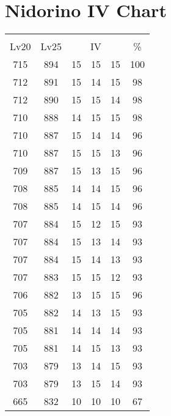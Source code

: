 \documentclass{article}%
\begin{document}
%
\normalsize%
\section{Nidorino IV Chart}%
\label{sec:Nidorino IV Chart}%
\renewcommand{\arraystretch}{1.5}%
\begin{tabular}{|c|c|c|c|c|c|}%
\hline%
\multicolumn{6}{|c|}{\textcolor{white}{ 
\linebreak{Nidorino}
}%
\cellcolor{black}}\\%
\multicolumn{1}{|c}{Lv20}&\multicolumn{1}{c|}{Lv25}&\multicolumn{3}{c|}{IV}&\multicolumn{1}{|c|}{\%}\\%
\hline%
\rowcolor{color100}%
715&894&15&15&15&100\\%
\hline%
\rowcolor{color98}%
712&891&15&14&15&98\\%
\hline%
\rowcolor{color98}%
712&890&15&15&14&98\\%
\hline%
\rowcolor{color98}%
710&888&14&15&15&98\\%
\hline%
\rowcolor{color96}%
710&887&15&14&14&96\\%
\hline%
\rowcolor{color96}%
710&887&15&15&13&96\\%
\hline%
\rowcolor{color96}%
709&887&15&13&15&96\\%
\hline%
\rowcolor{color96}%
708&885&14&14&15&96\\%
\hline%
\rowcolor{color96}%
708&885&14&15&14&96\\%
\hline%
\rowcolor{color93}%
707&884&15&12&15&93\\%
\hline%
\rowcolor{color93}%
707&884&15&13&14&93\\%
\hline%
\rowcolor{color93}%
707&884&15&14&13&93\\%
\hline%
\rowcolor{color93}%
707&883&15&15&12&93\\%
\hline%
\rowcolor{color96}%
706&882&13&15&15&96\\%
\hline%
\rowcolor{color93}%
705&882&14&13&15&93\\%
\hline%
\rowcolor{color93}%
705&881&14&14&14&93\\%
\hline%
\rowcolor{color93}%
705&881&14&15&13&93\\%
\hline%
\rowcolor{color93}%
703&879&13&14&15&93\\%
\hline%
\rowcolor{color93}%
703&879&13&15&14&93\\%
\hline%
\rowcolor{color91}%
665&832&10&10&10&67\\%
\end{tabular}

%
\end{document}
